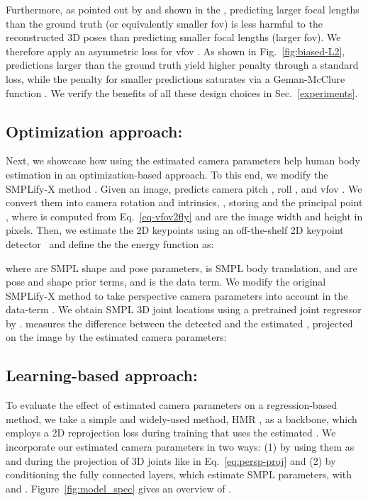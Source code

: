 \documentclass[10pt,twocolumn,letterpaper,usenames,dvipsnames]{article}
\begin{document}
Furthermore, as pointed out by \cite{kissosECCVW2020,yu2020pcls} and shown in the \supmat, predicting larger focal lengths than the ground truth (or equivalently smaller fov) is less harmful to the reconstructed 3D poses than predicting smaller focal lengths (larger fov).
We therefore apply an asymmetric loss for vfov .
As shown in Fig.~\ref{fig:biased-L2}, 
predictions  larger than the ground truth  yield higher penalty through a standard \ltwo loss, while the penalty for smaller predictions  saturates via a Geman-McClure function \cite{geman-mcclure}. 
We verify the benefits of all these design choices in Sec.~\ref{experiments}.

\subsection{Optimization approach: \smplify}
\label{optimization_method}
Next, we showcase how using the estimated camera parameters help human body estimation in an optimization-based approach. 
To this end, we modify the SMPLify-X method \cite{SMPL-X:2019}. 
Given an image, \camcalib predicts camera pitch , roll , and vfov .
We convert them into camera rotation  and intrinsics, , storing  and the principal point ,
where  is computed from Eq.~\ref{eq-vfov2fly} and  are the image width and height in pixels. Then, we estimate the 2D keypoints  using an off-the-shelf 2D keypoint detector~\cite{mmpose2020} and define the the \smplify energy function as:

where  are SMPL shape and pose parameters,  is SMPL body translation,  and  are pose and shape prior terms, and  is the data term. We modify the original SMPLify-X method to take perspective camera parameters into account in the data-term . 
We obtain SMPL 3D joint locations using a pretrained joint regressor  by . 
 measures the difference between the detected  and the estimated , projected on the image by the estimated camera parameters:

\subsection{Learning-based approach: \methodname}
\label{regression_method}
To evaluate the effect of estimated camera parameters on a regression-based method, we take a simple and widely-used method, HMR \cite{kanazawa_hmr}, as a backbone, which employs a 2D reprojection loss during training that uses the estimated \iwcam. 
We incorporate our estimated camera parameters in two ways:
(1) by using them as  and  during the projection of 3D joints like in Eq.~\ref{eq:persp-proj} and 
(2) by conditioning the fully connected layers, which estimate SMPL parameters, with  and .
Figure~\ref{fig:model_spec} gives an overview of \methodname.
\end{document}
